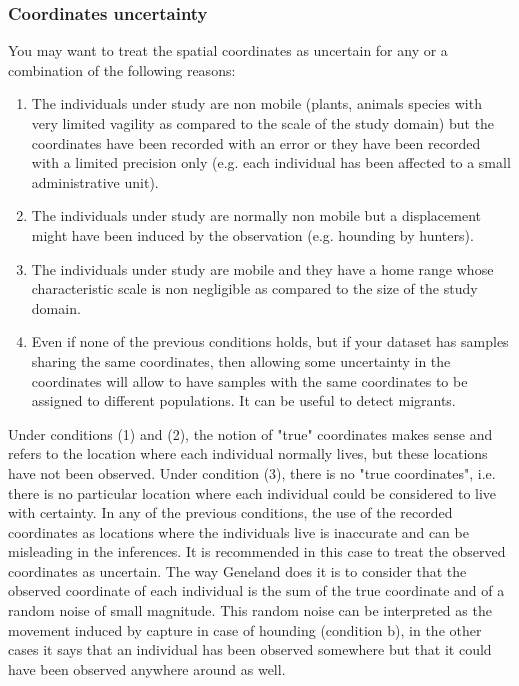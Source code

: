 \documentclass[a4paper,10pt]{article}
\begin{document}
\subsubsection{Coordinates uncertainty}\label{sec:uncertainty}


You may want to treat the spatial coordinates as uncertain for any or a combination of the following reasons:
\begin{enumerate}
\item The individuals under study are non mobile (plants, animals species with very limited vagility as compared 
to the scale of the study domain) but the coordinates have been recorded with an error or they have been recorded 
with a limited precision only (e.g.  each individual has been affected to a small administrative unit).
\item The individuals under study are normally non mobile but a displacement might have been induced by the observation 
(e.g. hounding by hunters).
\item The individuals under study are mobile and they have a home range whose characteristic scale is non negligible 
as compared to the size of the study domain.
\item Even if none of the previous conditions  holds, but if your dataset has samples sharing the same coordinates, 
then allowing some uncertainty in the coordinates will allow to have samples with the same coordinates 
to be assigned to different populations. It can be useful to detect migrants. 
\end{enumerate}


Under conditions (1) and (2), the notion of "true" coordinates makes sense and refers to the location where each  
individual normally lives, but these locations have not been observed.
Under condition (3),  there is no "true coordinates", i.e. there is no particular location where each individual could 
be considered to live with certainty.
In  any of the previous conditions, the use of the recorded coordinates as locations where the individuals live
is inaccurate and can be misleading in the inferences.
It is recommended in this case to treat the observed coordinates as uncertain. The way {\sc Geneland} does it is to consider 
that the observed coordinate of each individual is the sum of the true coordinate and of a random noise of small magnitude. 
This random noise can be interpreted as the movement induced by capture in case of hounding (condition b), in the other cases 
it says that an individual has been observed somewhere but that it could have been observed anywhere around as well.
\end{document}
